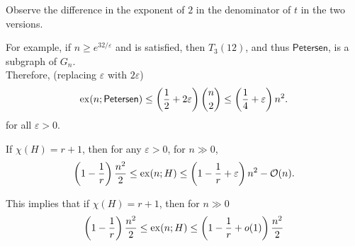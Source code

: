 			Observe the difference in the exponent of $2$ in the denominator of $t$ in the two versions.

			For example, if $n \ge e^{32/\varepsilon}$ and  is satisfied, then $T_{3}(12)$, and thus $\mathsf{Petersen}$, is a subgraph of $G_n$.\\
			Therefore, (replacing $\varepsilon$ with $2\varepsilon$)
			\[ \operatorname{ex}(n;\mathsf{Petersen}) \le \left(\frac{1}{2} + 2\varepsilon\right)\binom{n}{2} \le \left(\frac{1}{4} + \varepsilon\right)n^2. \]
			for all $\varepsilon > 0$.

			\begin{fcor}
				\label{theo: ESS exx square tight coloring}
				If $\chi(H) = r+1$, then for any $\varepsilon > 0$, for $n\gg 0$,
				\[ \left(1 - \frac{1}{r}\right)\frac{n^2}{2} \le \operatorname{ex}(n;H) \le \left(1 - \frac{1}{r} + \varepsilon\right)n^2 - \mathcal{O}(n). \]
			\end{fcor}

			This implies that if $\chi(H) = r+1$, then for $n\gg 0$
			\[ \left( 1 - \frac{1}{r} \right)\frac{n^2}{2} \le \operatorname{ex}(n;H) \le \left( 1 - \frac{1}{r} + o(1) \right)\frac{n^2}{2} \]


